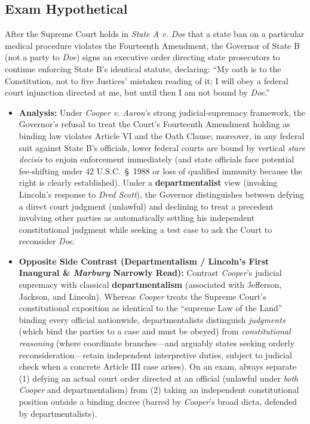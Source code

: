 \documentclass[12pt]{article}
\begin{document}
\subsection{Exam Hypothetical}
After the Supreme Court holds in \textit{State A v. Doe} that a state ban on a particular medical procedure violates the Fourteenth Amendment, the Governor of State B (not a party to \textit{Doe}) signs an executive order directing state prosecutors to continue enforcing State B's identical statute, declaring: ``My oath is to the Constitution, not to five Justices' mistaken reading of it; I will obey a federal court injunction directed at me, but until then I am not bound by \textit{Doe}.''
\begin{itemize}
  \item \textbf{Analysis:} Under \textit{Cooper v. Aaron}'s strong judicial-supremacy framework, the Governor's refusal to treat the Court's Fourteenth Amendment holding as binding law violates Article VI and the Oath Clause; moreover, in any federal suit against State B's officials, lower federal courts are bound by vertical \textit{stare decisis} to enjoin enforcement immediately (and state officials face potential fee-shifting under 42 U.S.C.\ \S~1988 or loss of qualified immunity because the right is clearly established). Under a \textbf{departmentalist} view (invoking Lincoln's response to \textit{Dred Scott}), the Governor distinguishes between defying a direct court judgment (unlawful) and declining to treat a precedent involving other parties as automatically settling his independent constitutional judgment while seeking a test case to ask the Court to reconsider \textit{Doe}.
  \item \textbf{Opposite Side Contrast (Departmentalism / Lincoln's First Inaugural \& \textit{Marbury} Narrowly Read):} Contrast \textit{Cooper}'s judicial supremacy with classical \textbf{departmentalism} (associated with Jefferson, Jackson, and Lincoln). Whereas \textit{Cooper} treats the Supreme Court's constitutional exposition as identical to the ``supreme Law of the Land'' binding every official nationwide, departmentalists distinguish \emph{judgments} (which bind the parties to a case and must be obeyed) from \emph{constitutional reasoning} (where coordinate branches---and arguably states seeking orderly reconsideration---retain independent interpretive duties, subject to judicial check when a concrete Article III case arises). On an exam, always separate (1) defying an actual court order directed at an official (unlawful under \emph{both} \textit{Cooper} and departmentalism) from (2) taking an independent constitutional position outside a binding decree (barred by \textit{Cooper}'s broad dicta, defended by departmentalists).
\end{itemize}
\end{document}
